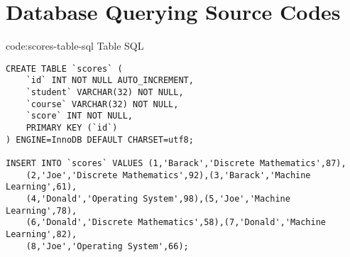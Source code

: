 \section{Database Querying Source Codes}\label{sect:database-querying-codes}

\begin{codeenv}{code:scores-table-sql}{ Table SQL}\begin{verbatim}
CREATE TABLE `scores` (
    `id` INT NOT NULL AUTO_INCREMENT,
    `student` VARCHAR(32) NOT NULL,
    `course` VARCHAR(32) NOT NULL,
    `score` INT NOT NULL,
    PRIMARY KEY (`id`)
) ENGINE=InnoDB DEFAULT CHARSET=utf8;

INSERT INTO `scores` VALUES (1,'Barack','Discrete Mathematics',87),
    (2,'Joe','Discrete Mathematics',92),(3,'Barack','Machine Learning',61),
    (4,'Donald','Operating System',98),(5,'Joe','Machine Learning',78),
    (6,'Donald','Discrete Mathematics',58),(7,'Donald','Machine Learning',82),
    (8,'Joe','Operating System',66);
\end{verbatim}
\end{codeenv}
